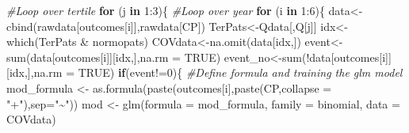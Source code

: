 \documentclass[
]{article}
\newenvironment{Shaded}{\begin{snugshade}}{\end{snugshade}}
\newcommand{\AttributeTok}[1]{\textcolor[rgb]{0.77,0.63,0.00}{#1}}
\newcommand{\CommentTok}[1]{\textcolor[rgb]{0.56,0.35,0.01}{\textit{#1}}}
\newcommand{\ConstantTok}[1]{\textcolor[rgb]{0.00,0.00,0.00}{#1}}
\newcommand{\ControlFlowTok}[1]{\textcolor[rgb]{0.13,0.29,0.53}{\textbf{#1}}}
\newcommand{\DecValTok}[1]{\textcolor[rgb]{0.00,0.00,0.81}{#1}}
\newcommand{\FunctionTok}[1]{\textcolor[rgb]{0.00,0.00,0.00}{#1}}
\newcommand{\NormalTok}[1]{#1}
\newcommand{\OtherTok}[1]{\textcolor[rgb]{0.56,0.35,0.01}{#1}}
\newcommand{\SpecialCharTok}[1]{\textcolor[rgb]{0.00,0.00,0.00}{#1}}
\newcommand{\StringTok}[1]{\textcolor[rgb]{0.31,0.60,0.02}{#1}}
\begin{document}
\begin{Shaded}
\begin{Highlighting}[]
\CommentTok{\#Loop over tertile}
\ControlFlowTok{for}\NormalTok{ (j }\ControlFlowTok{in} \DecValTok{1}\SpecialCharTok{:}\DecValTok{3}\NormalTok{)\{}
  \CommentTok{\#Loop over year}
  \ControlFlowTok{for}\NormalTok{ (i }\ControlFlowTok{in} \DecValTok{1}\SpecialCharTok{:}\DecValTok{6}\NormalTok{)\{}
\NormalTok{    data}\OtherTok{\textless{}{-}}\FunctionTok{cbind}\NormalTok{(rawdata[outcomes[i]],rawdata[CP])}
\NormalTok{    TerPats}\OtherTok{\textless{}{-}}\NormalTok{Qdata[,Q[j]]}
\NormalTok{    idx}\OtherTok{\textless{}{-}}\FunctionTok{which}\NormalTok{(TerPats }\SpecialCharTok{\&}\NormalTok{ normopats)}
\NormalTok{    COVdata}\OtherTok{\textless{}{-}}\FunctionTok{na.omit}\NormalTok{(data[idx,])}
\NormalTok{    event}\OtherTok{\textless{}{-}}\FunctionTok{sum}\NormalTok{(data[outcomes[i]][idx,],}\AttributeTok{na.rm =} \ConstantTok{TRUE}\NormalTok{)}
\NormalTok{    event\_no}\OtherTok{\textless{}{-}}\FunctionTok{sum}\NormalTok{(}\SpecialCharTok{!}\NormalTok{data[outcomes[i]][idx,],}\AttributeTok{na.rm =} \ConstantTok{TRUE}\NormalTok{)}
    \ControlFlowTok{if}\NormalTok{(event}\SpecialCharTok{!=}\DecValTok{0}\NormalTok{)\{}
    \CommentTok{\#Define formula and training the glm model}
\NormalTok{    mod\_formula }\OtherTok{\textless{}{-}} \FunctionTok{as.formula}\NormalTok{(}\FunctionTok{paste}\NormalTok{(outcomes[i],}\FunctionTok{paste}\NormalTok{(CP,}\AttributeTok{collapse =} \StringTok{"+"}\NormalTok{),}\AttributeTok{sep=}\StringTok{"\textasciitilde{}"}\NormalTok{))}
\NormalTok{    mod }\OtherTok{\textless{}{-}} \FunctionTok{glm}\NormalTok{(}\AttributeTok{formula =}\NormalTok{ mod\_formula, }\AttributeTok{family =}\NormalTok{ binomial, }\AttributeTok{data =}\NormalTok{ COVdata)}
  

\end{Highlighting}
\end{Shaded}
\end{document}
